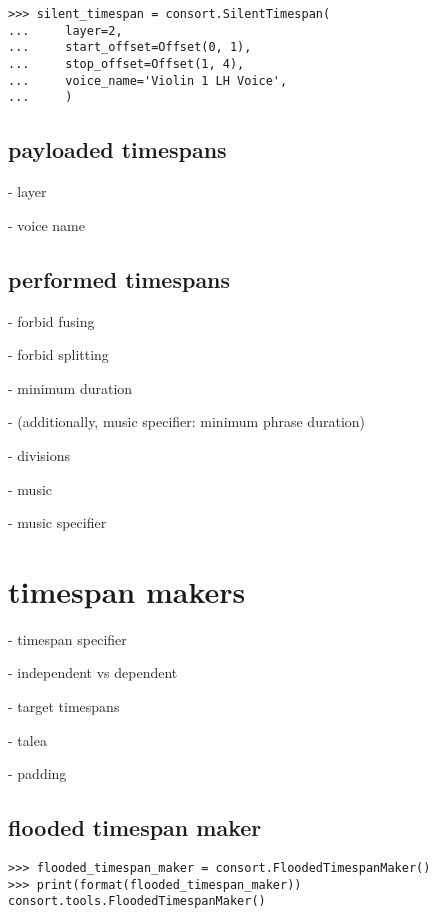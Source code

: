 \begin{singlespacing}
\begin{lstlisting}
>>> silent_timespan = consort.SilentTimespan(
...     layer=2,
...     start_offset=Offset(0, 1),
...     stop_offset=Offset(1, 4),
...     voice_name='Violin 1 LH Voice',
...     )
\end{lstlisting}
\end{singlespacing}

\subsection{payloaded timespans}

- layer

- voice name

\subsection{performed timespans}

- forbid fusing

- forbid splitting

- minimum duration

- (additionally, music specifier: minimum phrase duration)

- divisions

- music

- music specifier

\section{timespan makers}

- timespan specifier

- independent vs dependent

- target timespans

- talea

- padding

\subsection{flooded timespan maker}

\begin{comment}
<abjad>
flooded_timespan_maker = consort.FloodedTimespanMaker()
print(format(flooded_timespan_maker))
</abjad>
\end{comment}

\begin{singlespacing}
\begin{lstlisting}
>>> flooded_timespan_maker = consort.FloodedTimespanMaker()
>>> print(format(flooded_timespan_maker))
consort.tools.FloodedTimespanMaker()
\end{lstlisting}
\end{singlespacing}

